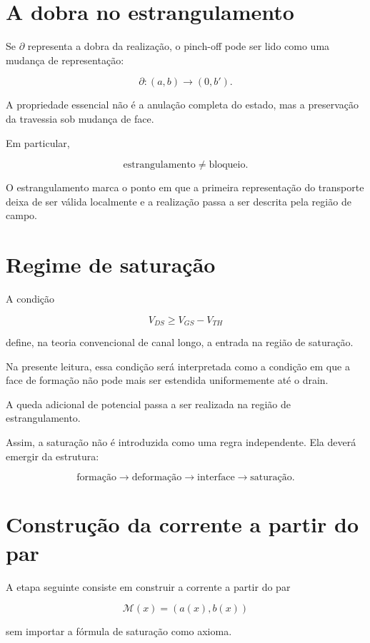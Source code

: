 \documentclass[11pt,a4paper]{article}
\begin{document}
\section{A dobra no estrangulamento}

Se \(\partial\) representa a dobra da realização, o pinch-off
pode ser lido como uma mudança de representação:

\[
\partial:
(a,b)
\longrightarrow
(0,b').
\]

A propriedade essencial não é a anulação completa do estado,
mas a preservação da travessia sob mudança de face.

Em particular,

\[
\boxed{
\text{estrangulamento}
\neq
\text{bloqueio}.
}
\]

O estrangulamento marca o ponto em que a primeira representação
do transporte deixa de ser válida localmente e a realização passa
a ser descrita pela região de campo.


\section{Regime de saturação}

A condição

\[
V_{DS}\geq V_{GS}-V_{TH}
\]

define, na teoria convencional de canal longo, a entrada na região
de saturação.

Na presente leitura, essa condição será interpretada como a
condição em que a face de formação não pode mais ser estendida
uniformemente até o drain.

A queda adicional de potencial passa a ser realizada na região
de estrangulamento.

Assim, a saturação não é introduzida como uma regra independente.
Ela deverá emergir da estrutura:

\[
\boxed{
\text{formação}
\rightarrow
\text{deformação}
\rightarrow
\text{interface}
\rightarrow
\text{saturação}.
}
\]


\section{Construção da corrente a partir do par}
\label{sec:corrente}

A etapa seguinte consiste em construir a corrente a partir do par

\[
\mathcal M(x)=(a(x),b(x))
\]

sem importar a fórmula de saturação como axioma.
\end{document}
